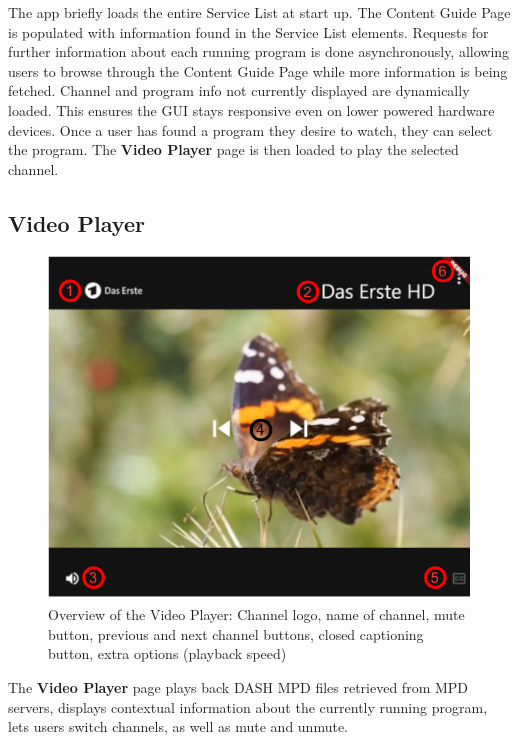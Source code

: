 \documentclass[conference]{IEEEtran}
\begin{document}
The app briefly loads the entire Service List at start up. The Content Guide Page is populated with information found in the Service List elements. Requests for further information about each running program is done asynchronously, allowing users to browse through the Content Guide Page while more information is being fetched. Channel and program info not currently displayed are dynamically loaded. This ensures the GUI stays responsive even on lower powered hardware devices. Once a user has found a program they desire to watch, they can select the program. The \textbf{Video Player} page is then loaded to play the selected channel.

\subsection{Video Player}
\begin{figure}[h]
	\centerline{\includegraphics[width=\linewidth]{figures/VideoPlayer}}
	\caption{Overview of the Video Player:  Channel logo,  name of channel,  mute button,  previous and next channel buttons,  closed captioning button,  extra options (playback speed) }
	\label{fig:videoPlayer}
\end{figure}
The \textbf{Video Player} page plays back DASH MPD files retrieved from MPD servers, displays contextual information about the currently running program, lets users switch channels, as well as mute and unmute. \\\par
\end{document}
